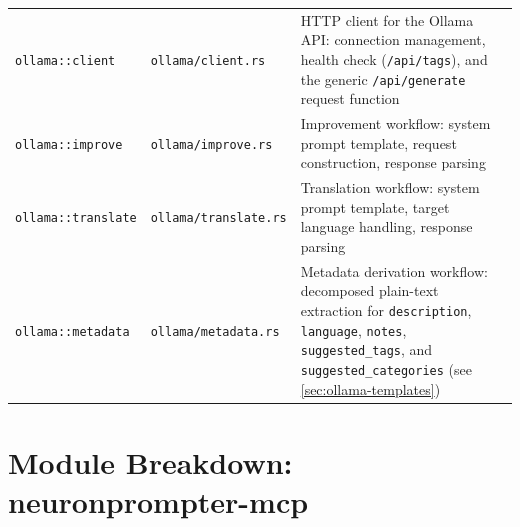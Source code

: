 \documentclass[a4paper, 11pt, oneside]{report}
\begin{document}
{\begin{longtable}{L{4cm} L{4.8cm} L{5.8cm}}
  \texttt{ollama::client}    & \texttt{ollama/client.rs}    & HTTP client for the Ollama API:
                                                             connection management, health check
                                                             (\texttt{/api/tags}), and the generic
                                                             \texttt{/api/generate} request function \\
  \texttt{ollama::improve}   & \texttt{ollama/improve.rs}   & Improvement workflow: system prompt
                                                             template, request construction,
                                                             response parsing \\
  \texttt{ollama::translate} & \texttt{ollama/translate.rs}  & Translation workflow: system prompt
                                                             template, target language handling,
                                                             response parsing \\
  \texttt{ollama::metadata}  & \texttt{ollama/metadata.rs}  & Metadata derivation workflow: decomposed
                                                             plain-text extraction for \texttt{description},
                                                             \texttt{language}, \texttt{notes}, \texttt{suggested\_tags},
                                                             and \texttt{suggested\_categories}
                                                             (see \cref{sec:ollama-templates}) \\
  \bottomrule
\end{longtable}
}

\section{Module Breakdown: neuronprompter-mcp}
\label{sec:mod-mcp}
\end{document}
